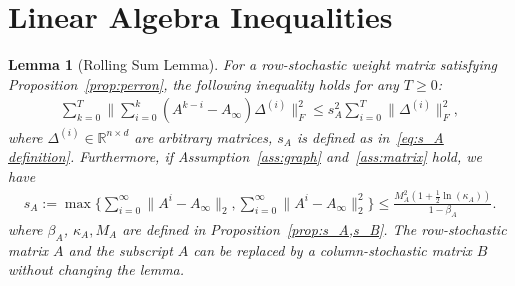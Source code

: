 \documentclass[10pt]{article}
\newcommand{\RR}{\mathbb{R}}
\newcommand{\norm}[1]{\| #1 \|}
\newtheorem{lemma}[thm]{Lemma}
\begin{document}



\appendix
\setcounter{table}{0}
\setcounter{figure}{0}
\renewcommand{\thetable}{A\arabic{table}}
\renewcommand{\thefigure}{A\arabic{figure}}
\section{Linear Algebra Inequalities}\label{app:sec:rolling sum}

\begin{lemma}[\sc \small Rolling Sum Lemma]\label{lem:rolling sum}
For a row-stochastic weight matrix satisfying Proposition~\ref{prop:perron}, the following inequality holds for any $ T\ge 0$:
    \begin{align}\label{eq:rolling sum A}
    \sum_{k=0}^T\norm{\sum_{i=0}^k(A^{k-i}-A_\infty)\Delta^{(i)}}_F^2\leq s_A^2\sum_{i=0}^T\norm{\Delta^{(i)}}_F^2,
    \end{align}
    where $\Delta^{(i)}\in \RR^{n\times d}$ are arbitrary matrices, $s_A$ is defined as in~\eqref{eq:s_A definition}. Furthermore, if Assumption~\ref{ass:graph} and~\ref{ass:matrix} hold, we have
    \begin{align*}
        s_A:= \max\{\sum_{i= 0}^\infty\norm{A^i-A_\infty}_2, \sum_{i= 0}^\infty\norm{A^i-A_\infty}_2^2\}\le \frac{M_A^2(1+\frac{1}{2}\ln(\kappa_A))}{1-\beta_A}.
    \end{align*} 
     where $\beta_A$, $\kappa_A, M_A$ are defined in Proposition~\ref{prop:s_A,s_B}. The row-stochastic matrix \(A\) and the subscript $A$ can be replaced by a column-stochastic matrix \(B\) without changing the lemma.
\end{lemma}
\end{document}
